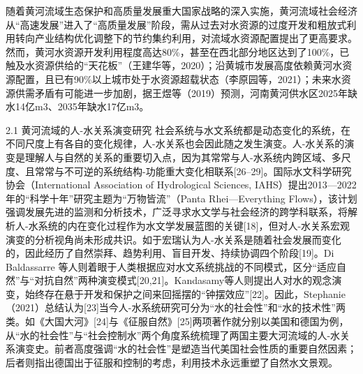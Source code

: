 随着黄河流域生态保护和高质量发展重大国家战略的深入实施，黄河流域社会经济从“高速发展”进入了“高质量发展”阶段，需从过去对水资源的过度开发和粗放式利用转向产业结构优化调整下的节约集约利用，对流域水资源配置提出了更高要求。然而，黄河水资源开发利用程度高达80\%，甚至在西北部分地区达到了100\%，已触及水资源供给的“天花板”（王建华等，2020）；沿黄城市发展高度依赖黄河水资源配置，且已有90\%以上城市处于水资源超载状态（李原园等，2021）；未来水资源供需矛盾有可能进一步加剧，据王煜等（2019）预测，河南黄河供水区2025年缺水14亿m3、2035年缺水17亿m3。


2.1 黄河流域的人-水关系演变研究
社会系统与水文系统都是动态变化的系统，在不同尺度上有各自的变化规律，人-水关系也会因此随之发生演变。人-水关系的演变是理解人与自然的关系的重要切入点，因为其常常与人-水系统内跨区域、多尺度、且常常与不可逆的系统结构-功能重大变化相联系[26–29]。国际水文科学研究协会（International Association of Hydrological Sciences, IAHS）提出2013—2022年的“科学十年”研究主题为“万物皆流”（Panta Rhei—Everything Flows），该计划强调发展先进的监测和分析技术，广泛寻求水文学与社会经济的跨学科联系，将解析人-水系统的内在变化过程作为水文学发展蓝图的关键[18]，但对人-水关系宏观演变的分析视角尚未形成共识。如于宏瑞认为人-水关系是随着社会发展而变化的，因此经历了自然崇拜、趋势利用、盲目开发、持续协调四个阶段[19]。Di Baldassarre 等人则着眼于人类根据应对水文系统挑战的不同模式，区分“适应自然”与“对抗自然”两种演变模式[20,21]。Kandasamy等人则提出人对水的观念演变，始终存在悬于开发和保护之间来回摇摆的“钟摆效应”[22]。因此，Stephanie（2021）总结认为[23]当今人-水系统研究可分为“水的社会性”和“水的技术性”两类。如《大国大河》[24]与《征服自然》[25]两项著作就分别以美国和德国为例，从“水的社会性”与“社会控制水”两个角度系统梳理了两国主要大河流域的人-水关系演变史。前者高度强调“水的社会性”是塑造当代美国社会性质的重要自然因素；后者则指出德国出于征服和控制的考虑，利用技术永远重塑了自然水文景观。

